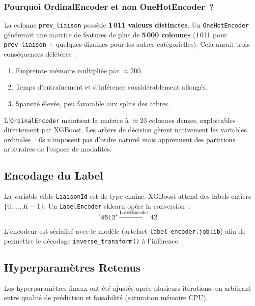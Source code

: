 \documentclass[11pt, a4paper]{article}
\begin{document}
\subsubsection*{Pourquoi OrdinalEncoder et non OneHotEncoder~?}

La colonne \texttt{prev\_liaison} possède \textbf{1\,011 valeurs
distinctes}. Un \texttt{OneHotEncoder} générerait une matrice de
features de plus de \textbf{5\,000 colonnes} (1\,011 pour
\texttt{prev\_liaison} + quelques dizaines pour les autres
catégorielles). Cela aurait trois conséquences délétères~:
\begin{enumerate}
\item Empreinte mémoire multipliée par $\approx 200$.
\item Temps d'entraînement et d'inférence considérablement allongés.
\item Sparsité élevée, peu favorable aux splits des arbres.
\end{enumerate}

L'\texttt{OrdinalEncoder} maintient la matrice à $\approx 23$ colonnes
denses, exploitables directement par XGBoost. Les arbres de décision
gèrent nativement les variables ordinales~: ils n'imposent pas d'ordre
naturel mais apprennent des partitions arbitraires de l'espace de
modalités.

\subsection{Encodage du Label}

La variable cible \texttt{LiaisonId} est de type chaîne. XGBoost attend
des labels entiers $\{0, \ldots, K-1\}$. Un
\texttt{LabelEncoder} sklearn opère la conversion~:
\[
\texttt{"4512"} \xrightarrow{\text{LabelEncoder}} 42
\]

L'encodeur est sérialisé avec le modèle (artefact
\texttt{label\_encoder.joblib}) afin de permettre le décodage
\texttt{inverse\_transform()} à l'inférence.

\subsection{Hyperparamètres Retenus}

Les hyperparamètres finaux ont été ajustés après plusieurs itérations,
en arbitrant entre qualité de prédiction et faisabilité (saturation
mémoire CPU).
\end{document}
